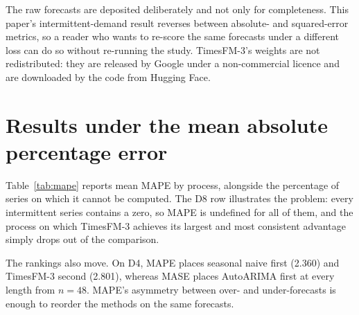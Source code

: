 \documentclass[article]{ajs}
\providecommand{\tableref}[1]{Table~\ref{#1}}
\begin{document}
The raw forecasts are deposited deliberately and not only for completeness. This paper's
intermittent-demand result reverses between absolute- and squared-error metrics, so a reader who
wants to re-score the same forecasts under a different loss can do so without re-running the
study. TimesFM-3's weights are not redistributed: they are released by Google under a
non-commercial licence and are downloaded by the code from Hugging Face.



\newpage
\appendix

\section{Results under the mean absolute percentage error}
\label{app:mape}

\tableref{tab:mape} reports mean MAPE by process, alongside the percentage of series on which
it cannot be computed. The D8 row illustrates the problem: every intermittent series contains a zero,
so MAPE is undefined for all of them, and the process on which TimesFM-3 achieves its largest
and most consistent advantage simply drops out of the comparison.

The rankings also move. On D4, MAPE places seasonal naive first (2.360) and TimesFM-3 second
(2.801), whereas MASE places AutoARIMA first at every length from $n = 48$. MAPE's asymmetry
between over- and under-forecasts is enough to reorder the methods on the same forecasts.


\end{document}
